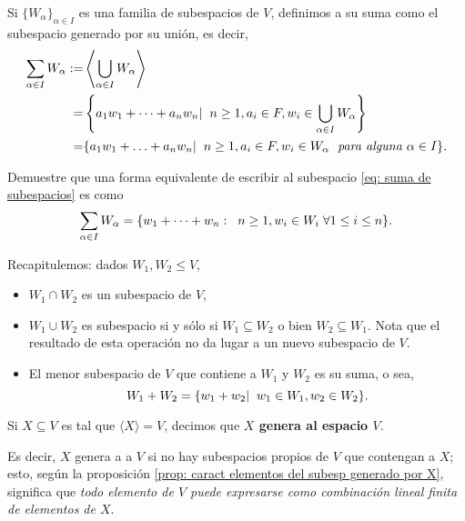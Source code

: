 \begin{defi}
Si $\{ W_{\alpha} \}_{\alpha \in I}$ es una familia de subespacios
de $V$, definimos a su suma como el subespacio generado por su unión,
es decir,
\begin{align}
	\label{eq: suma de subespacios}
\sum_{\alpha \in I} W_{\alpha} := &
\left\langle \bigcup_{\alpha \in I} W_{\alpha} 
\right\rangle \nonumber \\
= & \left\{ a_{1}w_{1} + \cdots +
a_{n}w_{n}  | \hspace{0.2cm} n \geq 1, a_{i} \in F,
w_{i} \in \bigcup_{\alpha \in I} W_{\alpha} \right\} \nonumber \\
= & \{ a_{1}w_{1} + \ldots + 
a_{n}w_{n}  | \hspace{0.2cm} n \geq 1,
a_{i} \in F, w_{i} \in W_{\alpha} 
\hspace{0.1cm} \textit{ para alguna } \alpha \in I \}.
\end{align}
\end{defi}

 Demuestre que una forma equivalente de
escribir al subespacio \eqref{eq: suma de subespacios}
es como
\begin{equation}
	\label{eq: suma de subespacios simplificado}
	\sum_{\alpha \in I} W_{\alpha} =
	\{ w_{1} + \cdots + w_{n} : \hspace{0.2cm}
	n \geq 1, w_{i} \in W_{i} \hspace{0.1cm} \forall 1 \leq i \leq n  \}.
\end{equation}


Recapitulemos: dados $W_{1}, W_{2} \leq V$,
\begin{itemize}
	\item $W_{1} \cap W_{2}$ es un subespacio de $V$,
	\item $W_{1} \cup W_{2}$ es subespacio si y sólo si 
	$W_{1} \subseteq W_{2}$ o bien $W_{2} \subseteq W_{1}$. Nota
	que el resultado de esta operación no da lugar a un nuevo
	subespacio de $V$.
	\item El menor subespacio de $V$ que contiene a $W_{1}$
	y $W_{2}$ es su suma, o sea, 
	\[
	W_{1} + W_{2} = \{ w_{1} + w_{2}  | \hspace{0.2cm} 
	w_{1} \in W_{1}, w_{2} \in W_{2} \}.
	\]
\end{itemize}

\begin{defi}
Si $X \subseteq V$ es tal que $\langle X \rangle = V$,
decimos que \textbf{$X$ genera al espacio $V$}.
\end{defi}
Es decir, $X$ genera a a $V$ si no hay subespacios propios
de $V$ que contengan a $X$; esto, según la proposición
\ref{prop: caract elementos del subesp generado por X}, significa que
\textit{todo elemento de $V$ puede expresarse como combinación
lineal finita de elementos de $X$}.

